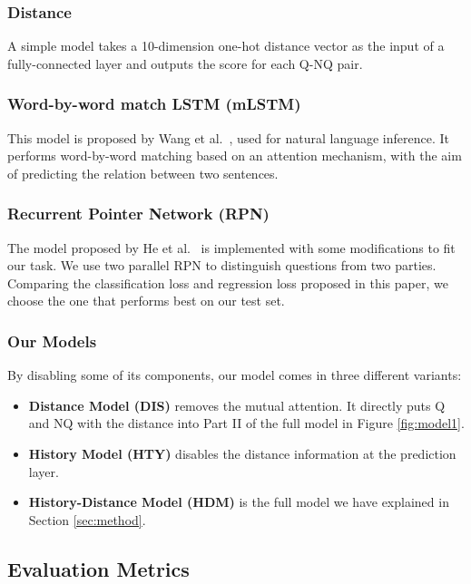 \subsubsection*{Distance}
A simple model takes a 10-dimension one-hot distance vector as the input of a fully-connected layer and outputs the score for each Q-NQ pair.  


\subsubsection*{Word-by-word match LSTM (mLSTM)}
This model is proposed by Wang et al.~, used for natural language inference. It performs word-by-word matching based on an attention mechanism, with the aim of predicting the relation between two sentences.


\subsubsection*{Recurrent Pointer Network (RPN)}
The model proposed by He et al.~ is implemented with some modifications to fit our task. We use two parallel RPN to distinguish questions from two parties. Comparing the classification loss and regression loss proposed in this paper, we choose the one that performs best on our test set.


\subsubsection*{Our Models}
By disabling some of its components, our model comes in three different
variants:
\begin{itemize}

    \item \textbf{Distance Model (DIS)} removes the mutual attention. It directly puts Q and NQ with the distance into Part II of the full model in Figure \ref{fig:model1}.
    \item \textbf{History Model (HTY)} disables the distance information at the prediction layer.
    \item \textbf{History-Distance Model (HDM)} is the full model we have explained in Section \ref{sec:method}.
\end{itemize}


\subsection{Evaluation Metrics}

